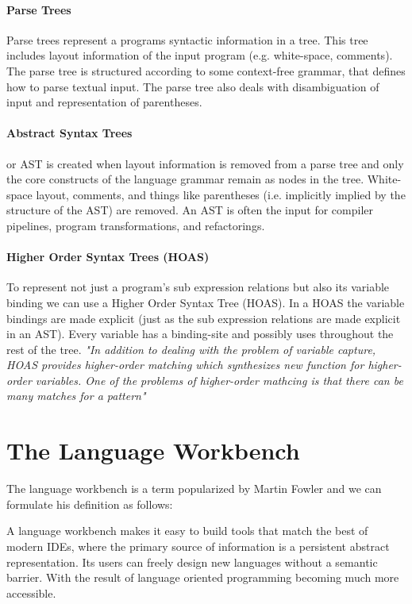 \paragraph{Parse Trees} 
Parse trees represent a programs syntactic information in a tree. This tree includes layout information of the input program (e.g. white-space, comments). The parse tree is structured according to some context-free grammar, that defines how to parse textual input. The parse tree also deals with disambiguation of input and representation of parentheses.

\paragraph{Abstract Syntax Trees}
or AST is created when layout information is removed from a parse tree and only the core constructs of the language grammar remain as nodes in the tree. White-space layout, comments, and things like parentheses (i.e. implicitly implied by the structure of the AST) are removed. An AST is often the input for compiler pipelines, program transformations, and refactorings.

\paragraph{Higher Order Syntax Trees (HOAS)}
To represent not just a program's sub expression relations but also its variable binding we can use a Higher Order Syntax Tree (HOAS)\cite{Pfenning}. In a HOAS the variable bindings are made explicit (just as the sub expression relations are made explicit in an AST). Every variable has a binding-site and possibly uses throughout the rest of the tree. \textit{"In addition to dealing with the problem of variable capture, HOAS provides higher-order matching which synthesizes new function for higher-order  variables. One of the problems of higher-order mathcing is that there can be many matches for a pattern"}\cite{Visser2001}

\section{The Language Workbench} \label{rascal}

The language workbench is a term popularized by Martin Fowler and we can formulate his definition as follows:

A language workbench makes it easy to build tools that match the best of modern IDEs, where the primary source of information is a persistent abstract representation. Its users can freely design new languages without a semantic barrier. With the result of language oriented programming becoming much more accessible.\cite{Fowler2005}

